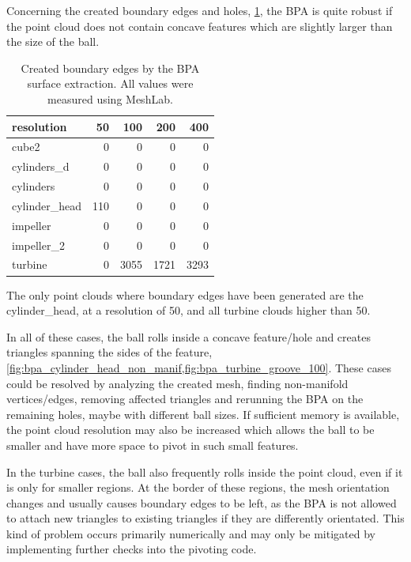 Concerning the created boundary edges and holes, \cf \cref{tbl:bpa_boundary edges}, the BPA is quite robust if the point cloud does not contain concave features which are slightly larger than the size of the ball.
%
\begin{table}
	\centering
	\begin{tabular}{l|r|r|r|r}
		resolution     &  50 &  100 &  200 &  400 \\
		\midrule
		cube2          &   0 &    0 &    0 &    0 \\
		cylinders\_d   &   0 &    0 &    0 &    0 \\
		cylinders      &   0 &    0 &    0 &    0 \\
		cylinder\_head & 110 &    0 &    0 &    0 \\
		impeller       &   0 &    0 &    0 &    0 \\
		impeller\_2    &   0 &    0 &    0 &    0 \\
		turbine        &   0 & 3055 & 1721 & 3293 \\
	\end{tabular}
	\caption{
		Created boundary edges by the BPA surface extraction.
		All values were measured using MeshLab.
	}
	\label{tbl:bpa_boundary edges}
\end{table}
%
The only point clouds where boundary edges have been generated are the cylinder\_head, at a resolution of 50, and all turbine clouds higher than 50.

In all of these cases, the ball rolls inside a concave feature/hole and creates triangles spanning the sides of the feature, \cf \cref{fig:bpa_cylinder_head_non_manif,fig:bpa_turbine_groove_100}.
These cases could be resolved by analyzing the created mesh, finding non-manifold vertices/edges, removing affected triangles and rerunning the BPA on the remaining holes, maybe with different ball sizes.
If sufficient memory is available, the point cloud resolution may also be increased which allows the ball to be smaller and have more space to pivot in such small features.

In the turbine cases, the ball also frequently rolls inside the point cloud, even if it is only for smaller regions.
At the border of these regions, the mesh orientation changes and usually causes boundary edges to be left, as the BPA is not allowed to attach new triangles to existing triangles if they are differently orientated.
This kind of problem occurs primarily numerically and may only be mitigated by implementing further checks into the pivoting code.



